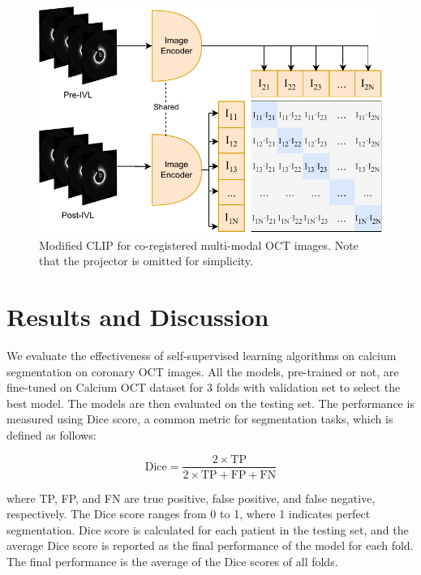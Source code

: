 \documentclass[a4paper,11pt,oneside]{report}
\begin{document}
\begin{figure}[hb]
    \centering
    \includegraphics[width=0.65\linewidth]{figures/fig_implementation_clip_oct.pdf}
    \caption{Modified CLIP for co-registered multi-modal OCT images. Note that the projector is omitted for simplicity.}
    \label{fig:clip-oct}
\end{figure}

\chapter{Results and Discussion}


We evaluate the effectiveness of self-supervised learning algorithms on calcium segmentation on coronary OCT images. All the models, pre-trained or not, are fine-tuned on Calcium OCT dataset for 3 folds with validation set to select the best model. The models are then evaluated on the testing set. The performance is measured using Dice score, a common metric for segmentation tasks, which is defined as follows:

\begin{equation}
    \text{Dice} = \frac{2 \times \text{TP}}{2 \times \text{TP} + \text{FP} + \text{FN}}
\end{equation}

where TP, FP, and FN are true positive, false positive, and false negative, respectively. The Dice score ranges from 0 to 1, where 1 indicates perfect segmentation. Dice score is calculated for each patient in the testing set, and the average Dice score is reported as the final performance of the model for each fold. The final performance is the average of the Dice scores of all folds.
\end{document}
